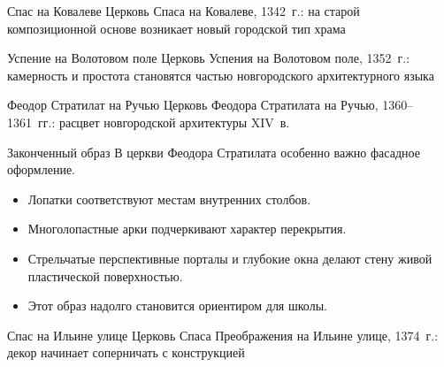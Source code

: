 \begin{frame}{Спас на Ковалеве}
    {Церковь Спаса на Ковалеве, 1342~г.:
     на старой композиционной основе возникает новый городской тип храма}
\end{frame}

\begin{frame}{Успение на Волотовом поле}
    {Церковь Успения на Волотовом поле, 1352~г.:
     камерность и простота становятся частью новгородского
     архитектурного языка}
\end{frame}

\begin{frame}{Феодор Стратилат на Ручью}
    {Церковь Феодора Стратилата на Ручью, 1360--1361~гг.:
     расцвет новгородской архитектуры XIV~в.}
\end{frame}

\begin{frame}{Законченный образ}
  В церкви Феодора Стратилата особенно важно фасадное оформление.

  \begin{itemize}
    \item Лопатки соответствуют местам внутренних столбов.
    \item Многолопастные арки подчеркивают характер перекрытия.
    \item Стрельчатые перспективные порталы и глубокие окна
          делают стену живой пластической поверхностью.
    \item Этот образ надолго становится ориентиром для школы.
  \end{itemize}
\end{frame}

\begin{frame}{Спас на Ильине улице}
    {Церковь Спаса Преображения на Ильине улице, 1374~г.:
     декор начинает соперничать с конструкцией}
\end{frame}

